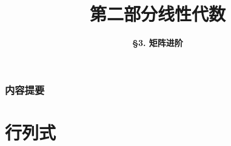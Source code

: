 


\usepackage{arydshln}


\title[Linear Algebra]{\LARGE \bfseries 第二部分\quad 线性代数} %
\author[More on Matrix] %
{\Large \bfseries \S 3. 矩阵进阶}
\date{}






\begin{frame}

\titlepage %

\end{frame}


\begin{frame}
\frametitle{内容提要} %
\tableofcontents %
\end{frame}


\section{行列式} %

